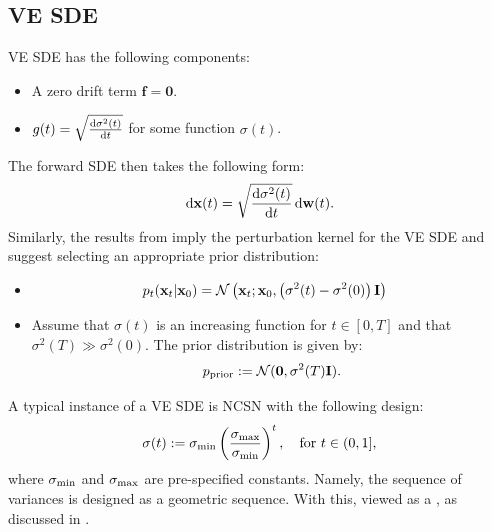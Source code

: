 \subsection{VE SDE}
VE SDE has the following components:
\begin{itemize}
    \item {} A zero drift term $\mathbf{f}=\bm{0}$.
    \item {} $g(t)=\sqrt{\frac{\mathop{}\!\mathrm{d} \sigma^2(t)}{\mathop{}\!\mathrm{d} t}}$ for some function $\sigma(t)$.
\end{itemize}
The forward SDE then takes the following form:
\begin{equation}\label{eq:vesde}
    \mathop{}\!\mathrm{d}{\mathbf{x}}(t) =  \sqrt{\frac{\mathop{}\!\mathrm{d} \sigma^2(t)}{\mathop{}\!\mathrm{d} t}} \mathop{}\!\mathrm{d}{\mathbf{w}}(t).
\end{equation} 
Similarly, the results from  imply the perturbation kernel for the VE SDE and suggest selecting an appropriate prior distribution:
\begin{itemize}
    \item {}
\begin{align*}
        p_t({\mathbf{x}}_t | {\mathbf{x}}_0) &= \mathcal{N}\left({\mathbf{x}}_t ; {\mathbf{x}}_0, \left(\sigma^2(t) - \sigma^2(0)\right){\mathbf{I}}\right) 
\end{align*}
    \item {} Assume that $\sigma(t)$ is an increasing function for $t \in [0,T]$ and that $\sigma^2(T) \gg \sigma^2(0)$. The prior distribution is given by:
    \[
    p_{\mathrm{prior}} := \mathcal{N}(\bm{0}, \sigma^2(T){\mathbf{I}}).
    \]
\end{itemize}

A typical instance of a VE SDE is NCSN with the following design:
\[
\sigma(t):=\sigma_{\textup{min}}\left(\frac{\sigma_{\textup{max}}}{\sigma_{\textup{min}}} \right)^t,\quad \text{for } t\in(0,1],
\]
where $\sigma_{\textup{min}}$ and $\sigma_{\textup{max}}$ are pre-specified constants. Namely, the sequence of variances is designed as a geometric sequence. With this,  viewed as a , as discussed in .

